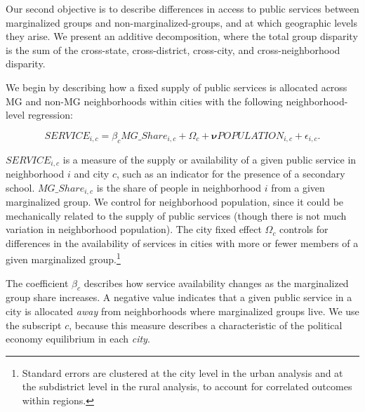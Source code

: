 \documentclass[12pt]{article}
\begin{document}
Our second objective is to describe differences in access to public services between marginalized groups and non-marginalized-groups, and at which geographic levels they arise. We present an additive decomposition, where the total group disparity is the sum of the cross-state, cross-district, cross-city, and cross-neighborhood disparity.

We begin by describing how a fixed supply of public services is allocated across MG and non-MG neighborhoods within cities with the following neighborhood-level regression:

\begin{equation}
  \label{eq:pg_share}
  SERVICE_{i,c} = \beta_c MG\_Share_{i,c} + \Omega_c + \boldsymbol\nu POPULATION_{i,c} + \epsilon_{i,c}\text{.}
\end{equation}

\noindent $SERVICE_{i,c}$ is a measure of the supply or availability of a given public service in neighborhood $i$ and city $c$, such as an indicator for the presence of a secondary school. $MG\_Share_{i,c}$ is the share of people in neighborhood $i$ from a given marginalized group. We control for neighborhood population, since it could be mechanically related to the supply of public services (though there is not much variation in neighborhood population). The city fixed effect $\Omega_c$ controls for differences in the availability of services in cities with more or fewer members of a given marginalized group.\footnote{Standard errors are clustered at the city level in the urban analysis and at the subdistrict level in the rural analysis, to account for correlated outcomes within regions.} 

The coefficient $\beta_c$ describes how service availability changes as the marginalized group share increases. A negative value indicates that a given public service in a city is allocated \textit{away} from neighborhoods where marginalized groups live. We use the subscript $c$, because this measure describes a characteristic of the political economy equilibrium in each \textit{city}.
\end{document}
